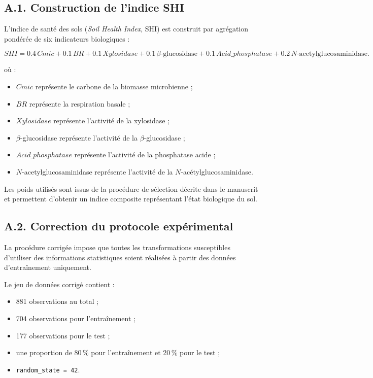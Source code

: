 \documentclass[12pt, a4paper, oneside, french]{report}
\begin{document}
\subsection*{A.1. Construction de l'indice SHI}

L'indice de santé des sols (\textit{Soil Health Index}, SHI) est construit
par agrégation pondérée de six indicateurs biologiques :

\begin{equation}
SHI =
0.4\,Cmic
+0.1\,BR
+0.1\,Xylosidase
+0.1\,\beta\text{-glucosidase}
+0.1\,Acid\_phosphatase
+0.2\,N\text{-acetylglucosaminidase}.
\end{equation}

où :

\begin{itemize}
    \item $Cmic$ représente le carbone de la biomasse microbienne ;
    \item $BR$ représente la respiration basale ;
    \item $Xylosidase$ représente l'activité de la xylosidase ;
    \item $\beta$-glucosidase représente l'activité de la
    $\beta$-glucosidase ;
    \item $Acid\_phosphatase$ représente l'activité de la phosphatase acide ;
    \item $N$-acetylglucosaminidase représente l'activité de la
    $N$-acétylglucosaminidase.
\end{itemize}

Les poids utilisés sont issus de la procédure de sélection décrite dans le
manuscrit et permettent d'obtenir un indice composite représentant l'état
biologique du sol.

\subsection*{A.2. Correction du protocole expérimental}

La procédure corrigée impose que toutes les transformations susceptibles
d'utiliser des informations statistiques soient réalisées à partir des
données d'entraînement uniquement.

Le jeu de données corrigé contient :

\begin{itemize}
    \item 881 observations au total ;
    \item 704 observations pour l'entraînement ;
    \item 177 observations pour le test ;
    \item une proportion de 80\,\% pour l'entraînement et 20\,\% pour le test ;
    \item \texttt{random\_state = 42}.
\end{itemize}
\end{document}
